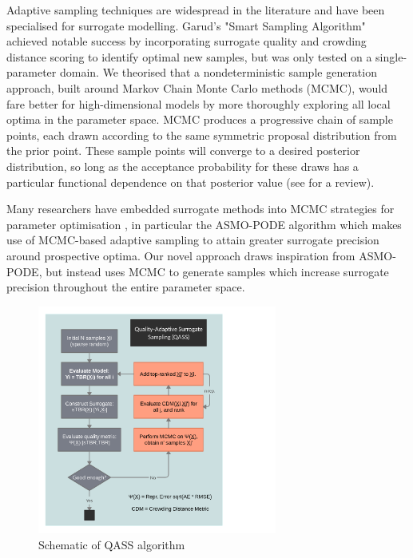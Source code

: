 Adaptive sampling techniques are widespread in the literature and have been specialised for surrogate modelling. Garud's \cite{Garud2016} "Smart Sampling Algorithm" achieved notable success by incorporating surrogate quality and crowding distance scoring to identify optimal new samples, but was only tested on a single-parameter domain. We theorised that a nondeterministic sample generation approach, built around Markov Chain Monte Carlo methods (MCMC), would fare better for high-dimensional models by more thoroughly exploring all local optima in the parameter space. MCMC produces a progressive chain of sample points, each drawn according to the same symmetric proposal distribution from the prior point. These sample points will converge to a desired posterior distribution, so long as the acceptance probability for these draws has a particular functional dependence on that posterior value (see \cite{Zhou2018} for a review). 

Many researchers have embedded surrogate methods into MCMC strategies for parameter optimisation \cite{Zhang2020}\cite{Gong2017}, in particular the ASMO-PODE algorithm \cite{Ginting2011} which makes use of MCMC-based adaptive sampling to attain greater surrogate precision around prospective optima. Our novel approach draws inspiration from ASMO-PODE, but instead uses MCMC to generate samples which increase surrogate precision throughout the entire parameter space.

\begin{figure}
  \vspace{-35pt}
  \begin{center}
    \includegraphics[width=0.7\textwidth]{fig4_qassplan.png}
    \caption{Schematic of QASS algorithm}
    \label{fig:qassplan}
  \end{center}
  \vspace{-80pt}
\end{figure}

